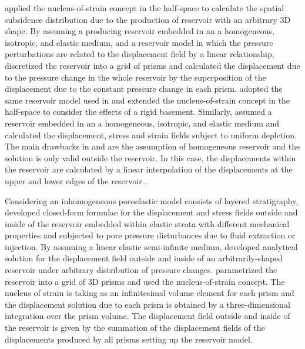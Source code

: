 \documentclass[journal abbreviation, manuscript]{copernicus}
\begin{document}
\cite{Geertsma&Opstal73} applied the nucleus-of-strain concept in the half-space 
to calculate the spatial subsidence distribution due to the production of reservoir with an arbitrary 3D shape.
By assuming a producing reservoir embedded in an a homogeneous, isotropic, and elastic medium, and a reservoir model in which the pressure perturbations are related to the displacement field by a linear relationship, \cite{Geertsma&Opstal73} discretized the reservoir into a grid of  prisms and calculated the displacement due to the pressure change in the whole reservoir  by the superposition of the displacement due to the constant pressure change in each prism.
\cite{Tempone10} adopted the same reservoir model used in \cite{Geertsma&Opstal73} and 
extended the nucleus-of-strain concept in the half-space to consider the effects of a rigid basement. 
Similarly, \cite{Tempone10} assumed a reservoir embedded in an a homogeneous, isotropic, and elastic medium and calculated the displacement, stress and strain fields subject to uniform depletion.
The main drawbacks in \cite{Geertsma&Opstal73} and \cite{Tempone10} are the assumption of homogeneous reservoir and the solution is only valid outside the reservoir.
In this case, the displacements within the reservoir are calculated by a linear interpolation of the displacements at the upper and lower edges of the reservoir \citep{Tempone12}.

Considering an inhomogeneous poroelastic model consists of layered stratigraphy, \cite{Mehrabian&Abousleiman15} developed closed-form formulae for the  displacement and stress  fields outside and inside of the reservoir embedded within elastic strata with different mechanical properties and subjected to pore pressure disturbances due to fluid extraction or injection. 
By assuming a linear elastic semi-infinite medium, \cite{Munoz&Roehl17} developed analytical solution for the  displacement field  outside and inside of an arbitrarily-shaped reservoir under arbitrary distribution of pressure changes. 
\cite{Munoz&Roehl17} parametrized the reservoir into a grid of 3D prisms and used the nucleus-of-strain concept. 
The nucleus of strain is taking as an infinitesimal volume element  for each prism and the displacement solution due to each prism is obtained by a three-dimensional integration over the prism volume. 
The displacement field outside and inside of the reservoir is given by the summation of the displacement fields of the displacements produced by all prisms setting up the reservoir model.
 
\end{document}
